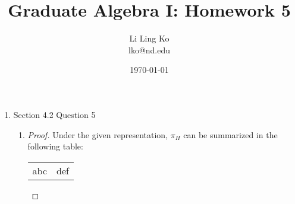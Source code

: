 \documentclass{article}
\begin{document}
\title{Graduate Algebra I: Homework 5}
\author{Li Ling Ko\\ lko@nd.edu}
\date{\today}
\maketitle

\begin{enumerate}
  \item Section 4.2 Question 5
    \begin{enumerate}
      \item
        \begin{proof}
          Under the given representation, $\pi_H$ can be summarized in the
          following table:
          \begin{center}
            \begin{tabular}{ll}
              abc & def \\
            \end{tabular}
          \end{center}
        \end{proof}
    \end{enumerate}
\end{enumerate}
\end{document}
